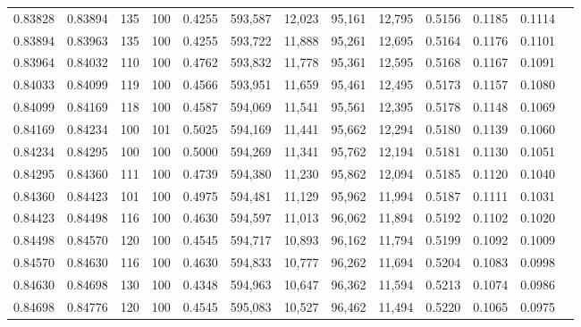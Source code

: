 \begin{tabular}{rrrrrrrrrrrrr}
0.83828 & 0.83894 &   135 & 100 &                                     0.4255 & 593,587 &  12,023 &  95,161 &  12,795 & 0.5156 & 0.1185 & 0.1114 \\
0.83894 & 0.83963 &   135 & 100 &                                     0.4255 & 593,722 &  11,888 &  95,261 &  12,695 & 0.5164 & 0.1176 & 0.1101 \\
0.83964 & 0.84032 &   110 & 100 &                                     0.4762 & 593,832 &  11,778 &  95,361 &  12,595 & 0.5168 & 0.1167 & 0.1091 \\
0.84033 & 0.84099 &   119 & 100 &                                     0.4566 & 593,951 &  11,659 &  95,461 &  12,495 & 0.5173 & 0.1157 & 0.1080 \\
0.84099 & 0.84169 &   118 & 100 &                                     0.4587 & 594,069 &  11,541 &  95,561 &  12,395 & 0.5178 & 0.1148 & 0.1069 \\
0.84169 & 0.84234 &   100 & 101 &                                     0.5025 & 594,169 &  11,441 &  95,662 &  12,294 & 0.5180 & 0.1139 & 0.1060 \\
0.84234 & 0.84295 &   100 & 100 &                                     0.5000 & 594,269 &  11,341 &  95,762 &  12,194 & 0.5181 & 0.1130 & 0.1051 \\
0.84295 & 0.84360 &   111 & 100 &                                     0.4739 & 594,380 &  11,230 &  95,862 &  12,094 & 0.5185 & 0.1120 & 0.1040 \\
0.84360 & 0.84423 &   101 & 100 &                                     0.4975 & 594,481 &  11,129 &  95,962 &  11,994 & 0.5187 & 0.1111 & 0.1031 \\
0.84423 & 0.84498 &   116 & 100 &                                     0.4630 & 594,597 &  11,013 &  96,062 &  11,894 & 0.5192 & 0.1102 & 0.1020 \\
0.84498 & 0.84570 &   120 & 100 &                                     0.4545 & 594,717 &  10,893 &  96,162 &  11,794 & 0.5199 & 0.1092 & 0.1009 \\
0.84570 & 0.84630 &   116 & 100 &                                     0.4630 & 594,833 &  10,777 &  96,262 &  11,694 & 0.5204 & 0.1083 & 0.0998 \\
0.84630 & 0.84698 &   130 & 100 &                                     0.4348 & 594,963 &  10,647 &  96,362 &  11,594 & 0.5213 & 0.1074 & 0.0986 \\
0.84698 & 0.84776 &   120 & 100 &                                     0.4545 & 595,083 &  10,527 &  96,462 &  11,494 & 0.5220 & 0.1065 & 0.0975 \\

\end{tabular}
